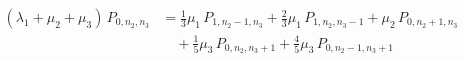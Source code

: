 \[
\begin{aligned}
  (\lambda_{1} + \mu_{2} + \mu_{3})\,P_{0,n_{2},n_{3}} &= \tfrac{1}{3}\mu_{1}\,P_{1,n_{2}-1,n_{3}} + \tfrac{2}{3}\mu_{1}\,P_{1,n_{2},n_{3}-1} + \mu_{2}\,P_{0,n_{2}+1,n_{3}}\\
  &\quad + \tfrac{1}{5}\mu_{3}\,P_{0,n_{2},n_{3}+1} + \tfrac{4}{5}\mu_{3}\,P_{0,n_{2}-1,n_{3}+1}
\end{aligned}
\]
